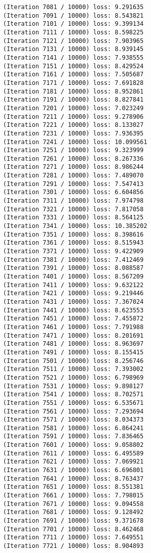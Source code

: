 \documentclass[11pt]{article}
\begin{document}
\begin{Verbatim}[commandchars=\\\{\}]
(Iteration 7081 / 10000) loss: 9.291635
(Iteration 7091 / 10000) loss: 8.543821
(Iteration 7101 / 10000) loss: 9.399134
(Iteration 7111 / 10000) loss: 8.598225
(Iteration 7121 / 10000) loss: 7.903965
(Iteration 7131 / 10000) loss: 8.939145
(Iteration 7141 / 10000) loss: 7.938555
(Iteration 7151 / 10000) loss: 8.429524
(Iteration 7161 / 10000) loss: 7.505687
(Iteration 7171 / 10000) loss: 7.691828
(Iteration 7181 / 10000) loss: 8.952861
(Iteration 7191 / 10000) loss: 8.827841
(Iteration 7201 / 10000) loss: 7.023249
(Iteration 7211 / 10000) loss: 9.278906
(Iteration 7221 / 10000) loss: 8.133027
(Iteration 7231 / 10000) loss: 7.936395
(Iteration 7241 / 10000) loss: 10.099561
(Iteration 7251 / 10000) loss: 9.323999
(Iteration 7261 / 10000) loss: 8.267336
(Iteration 7271 / 10000) loss: 8.986244
(Iteration 7281 / 10000) loss: 7.489070
(Iteration 7291 / 10000) loss: 7.547413
(Iteration 7301 / 10000) loss: 6.604856
(Iteration 7311 / 10000) loss: 7.974798
(Iteration 7321 / 10000) loss: 7.817058
(Iteration 7331 / 10000) loss: 8.564125
(Iteration 7341 / 10000) loss: 10.385202
(Iteration 7351 / 10000) loss: 8.398616
(Iteration 7361 / 10000) loss: 8.515943
(Iteration 7371 / 10000) loss: 9.422909
(Iteration 7381 / 10000) loss: 7.412469
(Iteration 7391 / 10000) loss: 8.088587
(Iteration 7401 / 10000) loss: 8.567209
(Iteration 7411 / 10000) loss: 9.632122
(Iteration 7421 / 10000) loss: 9.219446
(Iteration 7431 / 10000) loss: 7.367024
(Iteration 7441 / 10000) loss: 8.623553
(Iteration 7451 / 10000) loss: 7.455872
(Iteration 7461 / 10000) loss: 7.791988
(Iteration 7471 / 10000) loss: 8.201691
(Iteration 7481 / 10000) loss: 8.963697
(Iteration 7491 / 10000) loss: 8.155415
(Iteration 7501 / 10000) loss: 8.256746
(Iteration 7511 / 10000) loss: 7.393002
(Iteration 7521 / 10000) loss: 6.798969
(Iteration 7531 / 10000) loss: 9.898127
(Iteration 7541 / 10000) loss: 8.702571
(Iteration 7551 / 10000) loss: 6.535671
(Iteration 7561 / 10000) loss: 7.293694
(Iteration 7571 / 10000) loss: 8.034373
(Iteration 7581 / 10000) loss: 6.864241
(Iteration 7591 / 10000) loss: 7.836465
(Iteration 7601 / 10000) loss: 9.058802
(Iteration 7611 / 10000) loss: 6.495589
(Iteration 7621 / 10000) loss: 7.069921
(Iteration 7631 / 10000) loss: 6.696801
(Iteration 7641 / 10000) loss: 8.763437
(Iteration 7651 / 10000) loss: 8.551381
(Iteration 7661 / 10000) loss: 7.798015
(Iteration 7671 / 10000) loss: 9.094558
(Iteration 7681 / 10000) loss: 9.128492
(Iteration 7691 / 10000) loss: 9.371678
(Iteration 7701 / 10000) loss: 8.462468
(Iteration 7711 / 10000) loss: 7.649551
(Iteration 7721 / 10000) loss: 8.904893

\end{Verbatim}
\end{document}
